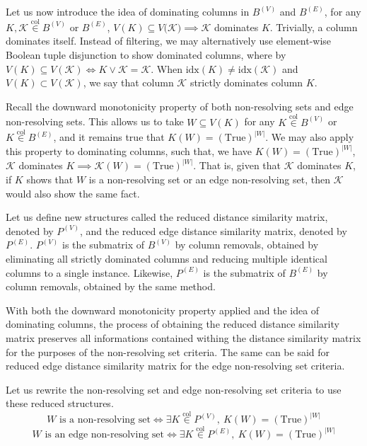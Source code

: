 \documentclass{article}
\begin{document}
Let us now introduce the idea of dominating columns in \(B^{(V)}\) and \(B^{(E)}\),
for any \(K, \mathcal{K} \overset{\mathrm{col}}{\in} B^{(V)}\) or \(B^{(E)}\), \({V(K) \subseteq V(\mathcal{K}}) \implies \mathcal{K}\) dominates \(K\). Trivially, a column dominates itself. Instead of filtering, we may alternatively use element-wise Boolean tuple disjunction to show dominated columns, where by \(V(K) \subseteq V(\mathcal{K}) \iff K \vee \mathcal{K} = \mathcal{K}\). When \(\mathrm{idx}(K) \neq \mathrm{idx}(\mathcal{K})\) and \(V(K) \subset V(\mathcal{K})\), we say that column \(\mathcal{K}\) strictly dominates column \(K\).

Recall the downward monotonicity property of both non-resolving sets and edge non-resolving sets. This allows us to take \(W \subseteq V(K)\) for any \(K \overset{\mathrm{col}}{\in} B^{(V)}\) or \(K \overset{\mathrm{col}}{\in} B^{(E)}\), and it remains true that \(K(W) = (\mathrm{True})^{|W|}\). We may also apply this property to dominating columns, such that, we have \(K(W) = (\mathrm{True})^{|W|}\), \(\mathcal{K}\) dominates \(K \implies {\mathcal{K}(W) = (\mathrm{True})^{|W|}}\). That is, given that \(\mathcal{K}\) dominates \(K\), if \(K\) shows that \(W\) is a non-resolving set or an edge non-resolving set, then \(\mathcal{K}\) would also show the same fact.

Let us define new structures called the reduced distance similarity matrix, denoted by \(P^{(V)}\), and the reduced edge distance similarity matrix, denoted by \(P^{(E)}\). \(P^{(V)}\) is the submatrix of \(B^{(V)}\) by column removals, obtained by eliminating all strictly dominated columns and reducing multiple identical columns to a single instance. Likewise, \(P^{(E)}\) is the submatrix of \(B^{(E)}\) by column removals, obtained by the same method.

With both the downward monotonicity property applied and the idea of dominating columns, the process of obtaining the reduced distance similarity matrix preserves all informations contained withing the distance similarity matrix for the purposes of the non-resolving set criteria. The same can be said for reduced edge distance similarity matrix for the edge non-resolving set criteria.

Let us rewrite the non-resolving set and edge non-resolving set criteria to use these reduced structures.
\[
	W \text{ is a non-resolving set} \iff \exists K \overset{\mathrm{col}}{\in} P^{(V)},\ K(W) = (\mathrm{True})^{|W|}
\]
\[
	W \text{ is an edge non-resolving set} \iff \exists K \overset{\mathrm{col}}{\in} P^{(E)},\ K(W) = (\mathrm{True})^{|W|}
\]
\end{document}
